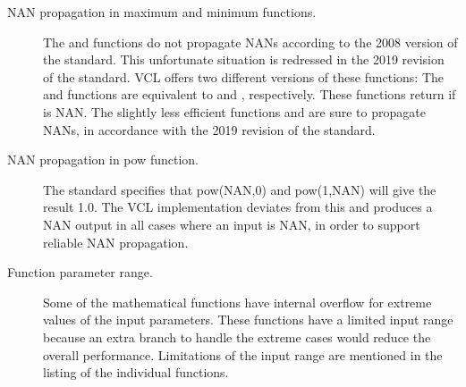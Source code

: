 \documentclass[vcl_manual.tex]{subfiles}
\begin{document}
\begin{description}
\item[NAN propagation in maximum and minimum functions.]
The  and  functions do not propagate NANs according to the 2008 version of the standard. This unfortunate situation is redressed in the  2019 revision of the standard. VCL offers two different versions of these functions:
The  and  functions are equivalent to 
 and 
, respectively. These functions return  if  is NAN. The slightly less efficient functions  and  are sure to propagate NANs, in accordance with the 2019 revision of the standard.

\item[NAN propagation in pow function.]
The standard specifies that pow(NAN,0) and pow(1,NAN) will give the result 1.0. The VCL implementation deviates from this and produces a NAN output in all cases where an input is NAN, in order to support reliable NAN propagation.

\item[Function parameter range.]
Some of the mathematical functions have internal overflow for extreme values of the input parameters. These functions have a limited input range because an extra branch to handle the extreme cases would reduce the overall performance. Limitations of the input range are mentioned in the listing of the individual functions.


\end{description}













\end{document}
